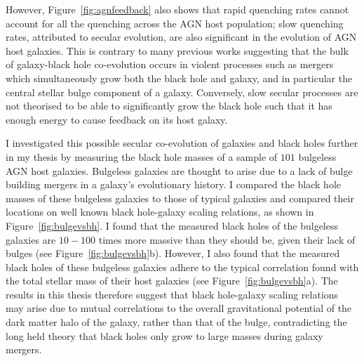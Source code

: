 \documentclass[12pt, usenatbib]{article}
\begin{document}
However, Figure~\ref{fig:agnfeedback} also shows that rapid quenching rates cannot account for all the quenching across the AGN host population; slow quenching rates, attributed to secular evolution, are also significant in the evolution of AGN host galaxies. This is contrary to many previous works suggesting that the bulk of galaxy-black hole co-evolution occurs in violent processes such as mergers which simultaneously grow both the black hole and galaxy, and in particular the central stellar bulge component of a galaxy. Conversely, slow secular processes are not theorised to be able to significantly grow the black hole such that it has enough energy to cause feedback on its host galaxy.

I investigated this possible secular co-evolution of galaxies and black holes further in my thesis by measuring the black hole masses of a sample of $101$ bulgeless AGN host galaxies. Bulgeless galaxies are thought to arise due to a lack of bulge building mergers in a galaxy's evolutionary history. I compared the black hole masses of these bulgeless galaxies to those of typical galaxies and compared their locations on well known black hole-galaxy scaling relations, as shown in Figure~\ref{fig:bulgevsbh}. I found that the measured black holes of the bulgeless galaxies are $10-100$ times more massive than they should be, given their lack of bulges (see Figure~\ref{fig:bulgevsbh}b). However, I also found that the measured black holes of these bulgeless galaxies adhere to the typical correlation found with the total stellar mass of their host galaxies (see Figure~\ref{fig:bulgevsbh}a). The results in this thesis therefore suggest that black hole-galaxy scaling relations may arise due to mutual correlations to the overall gravitational potential of the dark matter halo of the galaxy, rather than that of the bulge, contradicting the long held theory that black holes only grow to large masses during galaxy mergers. 
\end{document}
